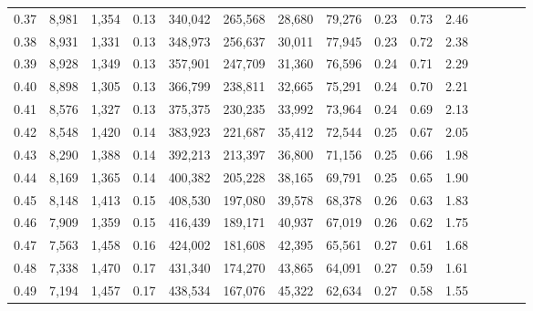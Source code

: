\begin{tabular}{rrrcrrrrrrrrrrr}
0.37 &   8,981 &   1,354 &                                       0.13 &  340,042 &  265,568 &   28,680 &   79,276 &  0.23 &  0.73 &                         2.46 \\
0.38 &   8,931 &   1,331 &                                       0.13 &  348,973 &  256,637 &   30,011 &   77,945 &  0.23 &  0.72 &                         2.38 \\
0.39 &   8,928 &   1,349 &                                       0.13 &  357,901 &  247,709 &   31,360 &   76,596 &  0.24 &  0.71 &                         2.29 \\
0.40 &   8,898 &   1,305 &                                       0.13 &  366,799 &  238,811 &   32,665 &   75,291 &  0.24 &  0.70 &                         2.21 \\
0.41 &   8,576 &   1,327 &                                       0.13 &  375,375 &  230,235 &   33,992 &   73,964 &  0.24 &  0.69 &                         2.13 \\
0.42 &   8,548 &   1,420 &                                       0.14 &  383,923 &  221,687 &   35,412 &   72,544 &  0.25 &  0.67 &                         2.05 \\
0.43 &   8,290 &   1,388 &                                       0.14 &  392,213 &  213,397 &   36,800 &   71,156 &  0.25 &  0.66 &                         1.98 \\
0.44 &   8,169 &   1,365 &                                       0.14 &  400,382 &  205,228 &   38,165 &   69,791 &  0.25 &  0.65 &                         1.90 \\
0.45 &   8,148 &   1,413 &                                       0.15 &  408,530 &  197,080 &   39,578 &   68,378 &  0.26 &  0.63 &                         1.83 \\
0.46 &   7,909 &   1,359 &                                       0.15 &  416,439 &  189,171 &   40,937 &   67,019 &  0.26 &  0.62 &                         1.75 \\
0.47 &   7,563 &   1,458 &                                       0.16 &  424,002 &  181,608 &   42,395 &   65,561 &  0.27 &  0.61 &                         1.68 \\
0.48 &   7,338 &   1,470 &                                       0.17 &  431,340 &  174,270 &   43,865 &   64,091 &  0.27 &  0.59 &                         1.61 \\
0.49 &   7,194 &   1,457 &                                       0.17 &  438,534 &  167,076 &   45,322 &   62,634 &  0.27 &  0.58 &                         1.55 \\

\end{tabular}

